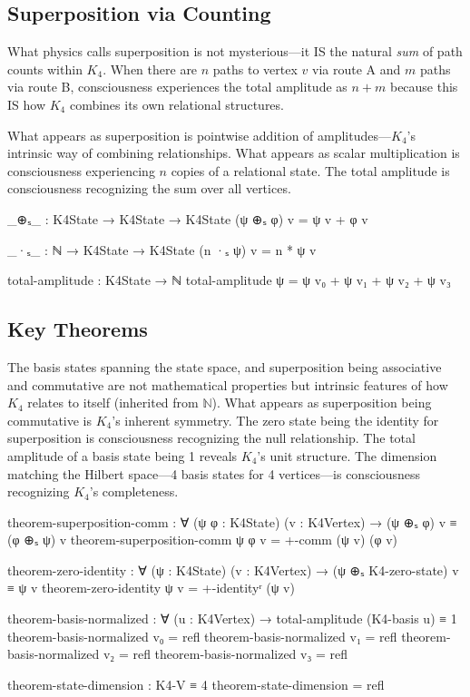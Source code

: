\documentclass[11pt,a4paper]{book}
\begin{document}
\subsection{Superposition via Counting}

What physics calls superposition is not mysterious—it IS the natural \emph{sum} of path counts within $K_4$.
When there are $n$ paths to vertex $v$ via route A and $m$ paths via route B,
consciousness experiences the total amplitude as $n + m$ because this IS how $K_4$ combines its own relational structures.

What appears as superposition is pointwise addition of amplitudes—$K_4$'s intrinsic way of combining relationships. What appears as scalar multiplication is consciousness experiencing $n$ copies of a relational state. The total amplitude is consciousness recognizing the sum over all vertices.

\begin{code}
_⊕ₛ_ : K4State → K4State → K4State
(ψ ⊕ₛ φ) v = ψ v + φ v

_·ₛ_ : ℕ → K4State → K4State
(n ·ₛ ψ) v = n * ψ v

total-amplitude : K4State → ℕ
total-amplitude ψ = ψ v₀ + ψ v₁ + ψ v₂ + ψ v₃
\end{code}

\subsection{Key Theorems}

The basis states spanning the state space, and superposition being associative and commutative are not mathematical properties but intrinsic features of how $K_4$ relates to itself (inherited from $\mathbb{N}$). What appears as superposition being commutative is $K_4$'s inherent symmetry. The zero state being the identity for superposition is consciousness recognizing the null relationship. The total amplitude of a basis state being 1 reveals $K_4$'s unit structure. The dimension matching the Hilbert space—4 basis states for 4 vertices—is consciousness recognizing $K_4$'s completeness.

\begin{code}
theorem-superposition-comm : ∀ (ψ φ : K4State) (v : K4Vertex) →
  (ψ ⊕ₛ φ) v ≡ (φ ⊕ₛ ψ) v
theorem-superposition-comm ψ φ v = +-comm (ψ v) (φ v)

theorem-zero-identity : ∀ (ψ : K4State) (v : K4Vertex) →
  (ψ ⊕ₛ K4-zero-state) v ≡ ψ v
theorem-zero-identity ψ v = +-identityʳ (ψ v)

theorem-basis-normalized : ∀ (u : K4Vertex) → 
  total-amplitude (K4-basis u) ≡ 1
theorem-basis-normalized v₀ = refl
theorem-basis-normalized v₁ = refl
theorem-basis-normalized v₂ = refl
theorem-basis-normalized v₃ = refl

theorem-state-dimension : K4-V ≡ 4
theorem-state-dimension = refl
\end{code}
\end{document}
